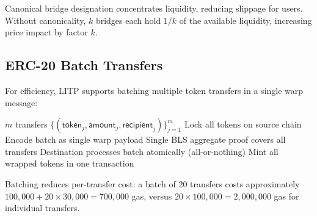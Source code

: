 \begin{proposition}
Canonical bridge designation concentrates liquidity, reducing slippage for users. Without canonicality, $k$ bridges each hold $1/k$ of the available liquidity, increasing price impact by factor $k$.
\end{proposition}

\subsection{ERC-20 Batch Transfers}

For efficiency, LITP supports batching multiple token transfers in a single warp message:

\begin{algorithm}[H]
\caption{Batch Token Transfer}
\label{alg:batch}
\begin{algorithmic}[1]
\Require $m$ transfers $\{(\mathsf{token}_j, \mathsf{amount}_j, \mathsf{recipient}_j)\}_{j=1}^m$
\State Lock all tokens on source chain
\State Encode batch as single warp payload
\State Single BLS aggregate proof covers all transfers
\State Destination processes batch atomically (all-or-nothing)
\State Mint all wrapped tokens in one transaction
\end{algorithmic}
\end{algorithm}

Batching reduces per-transfer cost: a batch of 20 transfers costs approximately $100{,}000 + 20 \times 30{,}000 = 700{,}000$ gas, versus $20 \times 100{,}000 = 2{,}000{,}000$ gas for individual transfers.

